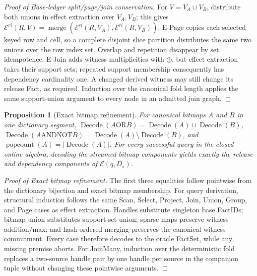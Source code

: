 \documentclass[journal,onecolumn]{IEEEtran}
\newtheorem{proposition}{Proposition}
\newcommand{\effect}{\mathcal E}
\newcommand{\rieffect}{\mathcal E^{ri}}
\begin{document}
\begin{proof}[Proof of Base-ledger split/page/join conservation]
For $V=V_A\cup V_B$, distribute both unions in effect extraction over
$V_A,V_B$; this gives
$\rieffect(R,V)=\operatorname{merge}(\rieffect(R,V_A),\rieffect(R,V_B))$.
E-Page copies each selected keyed row and cell, so a complete disjoint slice
partition distributes the same two unions over the row index set. Overlap and
repetition disappear by set idempotence. E-Join adds witness multiplicities
with $\oplus$, but effect extraction takes their support sets; repeated support
membership consequently has dependency cardinality one. A changed derived
witness may still change its release Fact, as required. Induction over the
canonical fold length applies the same support-union argument to every node in
an admitted join graph.
\end{proof}

\begin{proposition}[Exact bitmap refinement]
For canonical bitmaps $A$ and $B$ in one dictionary segment,
$\operatorname{Decode}(A\mathbin{\mathrm{OR}}B)=
\operatorname{Decode}(A)\cup\operatorname{Decode}(B)$,
$\operatorname{Decode}(A\mathbin{\mathrm{ANDNOT}}B)=
\operatorname{Decode}(A)\setminus\operatorname{Decode}(B)$, and
$\operatorname{popcount}(A)=|\operatorname{Decode}(A)|$. For every successful
query in the closed online algebra, decoding the streamed bitmap components
yields exactly the release and dependency components of $\effect(q,D_s)$.
\end{proposition}

\begin{proof}[Proof of Exact bitmap refinement]
The first three equalities follow pointwise from the dictionary bijection and
exact bitmap membership. For query derivation, structural induction follows
the same Scan, Select, Project, Join, Union, Group, and Page cases as effect
extraction. Handles substitute singleton base FactIDs; bitmap union substitutes
support-set union; sparse maps preserve witness addition/max; and hash-ordered
merging preserves the canonical witness commitment. Every case therefore
decodes to the oracle FactSet, while any missing premise aborts. For JoinMany,
induction over the deterministic fold replaces a two-source handle pair by one
handle per source in the companion tuple without changing these pointwise
arguments.
\end{proof}
\end{document}
